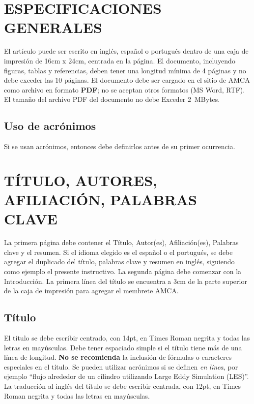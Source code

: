 \documentclass[oneside,a4paper,spanish,links]{amca}
\begin{document}
\section{ESPECIFICACIONES GENERALES}

El artículo puede ser escrito en inglés, español o portugués
dentro de una caja de impresión de 16cm x 24cm, centrada en la
página. El documento, incluyendo figuras, tablas y referencias,
deben tener una longitud mínima de 4 páginas y no debe exceder las
10 páginas. El documento debe ser cargado en el sitio de AMCA como
archivo en formato \textbf {PDF}; no se aceptan otros formatos (MS
Word, RTF). El tamaño del archivo PDF del documento no debe
Exceder 2~MBytes.

\subsection{Uso de acrónimos}

Si se usan acrónimos, entonces debe definirlos antes de su primer ocurrencia.

\section{TÍTULO, AUTORES, AFILIACIÓN, PALABRAS CLAVE}

La primera página debe contener el Título, Autor(es),
Afiliación(es), Palabras clave y el resumen. Si el idioma elegido
es el español o el portugués, se debe agregar el duplicado del
título, palabras clave y resumen en inglés, siguiendo como ejemplo
el presente instructivo. La segunda página debe comenzar con la
Introducción. La primera línea del título se encuentra a 3cm de la
parte superior de la caja de impresión para agregar el membrete
AMCA.

\subsection{Título}

El título se debe escribir centrado, con 14pt, en Times Roman
negrita y todas las letras en mayúsculas. Debe tener espaciado
simple si el título tiene más de una línea de longitud. \textbf{No
se recomienda} la inclusión de fórmulas o caracteres especiales en
el título. Se pueden utilizar acrónimos si se definen \emph{en
línea}, por ejemplo ``flujo alrededor de un cilindro utilizando
Large Eddy Simulation (LES)''. La traducción al inglés del título
se debe escribir centrada, con 12pt, en Times Roman negrita y
todas las letras en mayúsculas.
\end{document}
